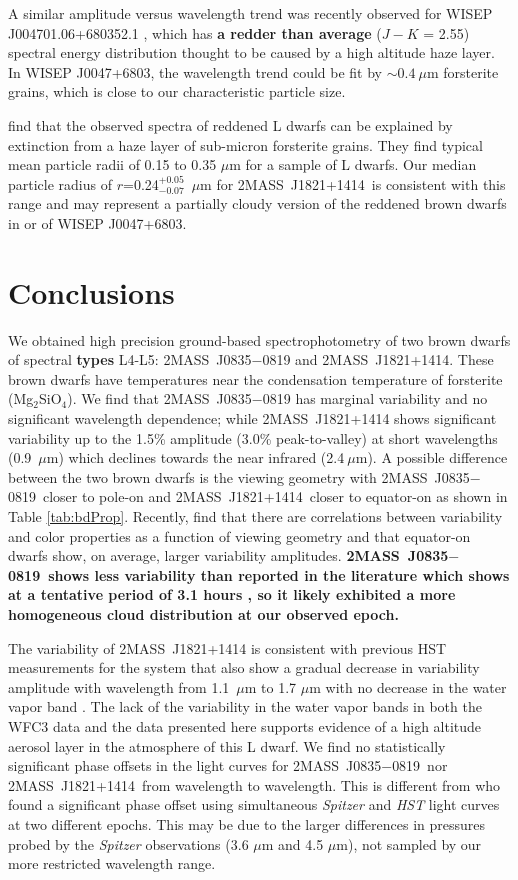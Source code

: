 \documentclass[twocolumn]{aastex6}
\newcommand{\sha}{2MASS~J0835$-$0819}
\newcommand{\shb}{2MASS~J1821+1414}
\begin{document}
A similar amplitude versus wavelength trend was recently observed for WISEP J004701.06+680352.1 \citep{2016ApJ...829L..32L}, which has \textbf{a redder than average} ($J-K$ = 2.55) spectral energy distribution thought to be caused by a high altitude haze layer.
In WISEP J0047+6803, the wavelength trend could be fit by $\sim0.4~\mu$m forsterite grains, which is close to our characteristic particle size.

\citet{hiranaka2016subMicronDust} find that the observed spectra of reddened L dwarfs can be explained by extinction from a haze layer of sub-micron forsterite grains.
They find typical mean particle radii of 0.15 to 0.35 $\mu$m for a sample of L dwarfs.
Our median particle radius of $r$=0.24$^{+0.05}_{-0.07}$~$\mu$m for \shb\ is consistent with this range and may represent a partially cloudy version of the reddened brown dwarfs in \citet{hiranaka2016subMicronDust} or of WISEP J0047+6803.

\section{Conclusions}\label{sec:conclusions}

We obtained high precision ground-based spectrophotometry of two brown dwarfs of spectral \textbf{types} L4-L5: {\sha} and {\shb}.
These brown dwarfs have temperatures near the condensation temperature of forsterite (Mg$_2$SiO$_4$).
We find that {\sha} has marginal variability and no significant wavelength dependence; while
{\shb} shows significant variability up to the 1.5\% amplitude (3.0\% peak-to-valley) at short wavelengths (0.9~$\mu$m) which declines towards the near infrared (2.4$~\mu$m).
A possible difference between the two brown dwarfs is the viewing geometry with \sha\ closer to pole-on and \shb\ closer to equator-on as shown in Table \ref{tab:bdProp}.
Recently, \citet{vos2017viewingGeom} find that there are correlations between variability and color properties as a function of viewing geometry and that equator-on dwarfs show, on average, larger variability amplitudes.
\textbf{\sha\ shows less variability than reported in the literature which shows at a tentative period of 3.1 hours \citep{2004MNRAS.354..378K,2014A&A...566A.111W}, so it likely exhibited a more homogeneous cloud distribution at our observed epoch.}

The variability of {\shb} is consistent with previous HST measurements for the system that also show a gradual decrease in variability amplitude with wavelength from 1.1~$\mu$m to 1.7 $\mu$m with no decrease in the water vapor band \citep{2016ApJ...826....8Y}.
The lack of the variability in the water vapor bands in both the WFC3 data and the data presented here supports evidence of a high altitude aerosol layer in the atmosphere of this L dwarf.
We find no statistically significant phase offsets in the light curves for \sha\ nor \shb\ from wavelength to wavelength.
This is different from  \citep{2016ApJ...826....8Y} who found a significant phase offset using simultaneous {\em Spitzer} and {\em HST} light curves at two different epochs.
This may be due to the larger differences in pressures probed by the {\em Spitzer} observations (3.6 $\mu$m and 4.5 $\mu$m), not sampled by our more restricted wavelength range.
\end{document}
